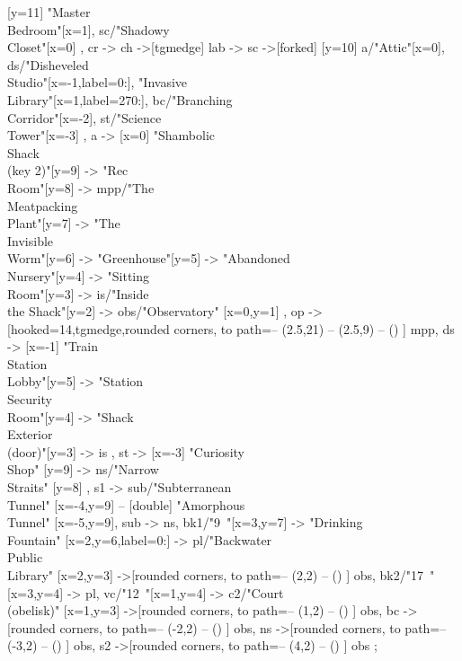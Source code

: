 \documentclass[a5paper]{extarticle}
\begin{document}
\begin{adjustbox}{max size={\linewidth}{\dimexpr\textheight - 2.5em\relax},center}
\begin{gamemap}[>={Stealth[round,black]},set grid={8.5em}{5.5em}]
{  { [y=11] "Master\\Bedroom"[x=1], sc/"Shadowy\\Closet"[x=0] },
  cr -> ch ->[tgmedge] lab -> sc ->[forked]
  { [y=10] a/"Attic"[x=0], ds/"Disheveled\\Studio"[x=-1,label={0:\faBook}], "Invasive\\Library"[x=1,label={270:\faBook}],
    bc/"Branching\\Corridor"[x=-2], st/"Science\\Tower"[x=-3] },
  a ->
  { [x=0] "Shambolic\\Shack\\(key 2)"[y=9] -> "Rec\\Room"[y=8] -> mpp/"The\\Meatpacking\\Plant"[y=7] ->
    "The\\Invisible\\Worm"[y=6] -> "Greenhouse"[y=5] -> "Abandoned\\Nursery"[y=4] -> "Sitting\\Room"[y=3] ->
    is/"Inside\\the Shack"[y=2] -> obs/"Observatory" [x=0,y=1] },
  op ->[hooked=14,tgmedge,rounded corners,%
        to path={-- (2.5,21) -- (2.5,9) -- (\tikztotarget) \tikztonodes}] mpp,
  ds ->
  { [x=-1] "Train\\Station\\Lobby"[y=5] -> "Station\\Security\\Room"[y=4] -> "Shack\\Exterior\\(door)"[y=3] -> is },
  st -> { [x=-3] "Curiosity\\Shop" [y=9] -> ns/"Narrow\\Straits" [y=8] },
  s1 -> sub/"Subterranean\\Tunnel" [x=-4,y=9] -- [double] "Amorphous\\Tunnel" [x=-5,y=9],
  sub -> ns,
  bk1/"9~\faBook"[x=3,y=7] -> "Drinking\\Fountain" [x=2,y=6,label={0:\faBook}] -> pl/"Backwater\\Public\\Library" [x=2,y=3]
      ->[rounded corners, to path={-- (2,2) -- (\tikztotarget) \tikztonodes}] obs,
  bk2/"17~\faBook"[x=3,y=4] -> pl,
  vc/"12~\faUniversity"[x=1,y=4] -> c2/"Court\\(obelisk)" [x=1,y=3]
     ->[rounded corners, to path={-- (1,2) -- (\tikztotarget) \tikztonodes}] obs,
  bc ->[rounded corners, to path={-- (-2,2) -- (\tikztotarget) \tikztonodes}] obs,
  ns ->[rounded corners, to path={-- (-3,2) -- (\tikztotarget) \tikztonodes}] obs,
  s2 ->[rounded corners, to path={-- (4,2) -- (\tikztotarget) \tikztonodes}] obs
};
\end{gamemap}
\end{adjustbox}
\end{document}
